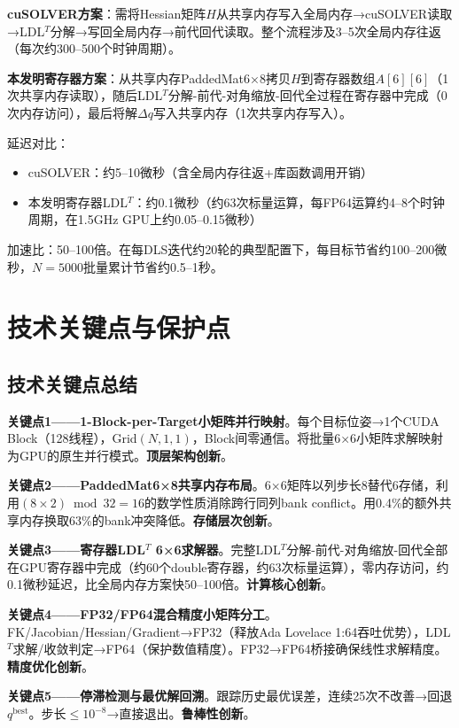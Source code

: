 \documentclass[a4paper,12pt]{ctexart}
\begin{document}
\textbf{cuSOLVER方案}：需将Hessian矩阵$H$从共享内存写入全局内存→cuSOLVER读取→LDL$^T$分解→写回全局内存→前代回代读取。整个流程涉及3--5次全局内存往返（每次约300--500个时钟周期）。

\textbf{本发明寄存器方案}：从共享内存PaddedMat6×8拷贝$H$到寄存器数组$A[6][6]$（1次共享内存读取），随后LDL$^T$分解-前代-对角缩放-回代全过程在寄存器中完成（0次内存访问），最后将解$\Delta q$写入共享内存（1次共享内存写入）。

延迟对比：
\begin{itemize}
    \item cuSOLVER：约5--10微秒（含全局内存往返+库函数调用开销）
    \item 本发明寄存器LDL$^T$：约0.1微秒（约63次标量运算，每FP64运算约4--8个时钟周期，在1.5GHz GPU上约0.05--0.15微秒）
\end{itemize}
加速比：50--100倍。在每DLS迭代约20轮的典型配置下，每目标节省约100--200微秒，$N=5000$批量累计节省约0.5--1秒。

\section{技术关键点与保护点}

\subsection{技术关键点总结}

\textbf{关键点1——1-Block-per-Target小矩阵并行映射}。每个目标位姿→1个CUDA Block（128线程），Grid$(N,1,1)$，Block间零通信。将批量6×6小矩阵求解映射为GPU的原生并行模式。\textbf{顶层架构创新}。

\textbf{关键点2——PaddedMat6×8共享内存布局}。6×6矩阵以列步长8替代6存储，利用$(8\times2)\bmod 32=16$的数学性质消除跨行同列bank conflict。用0.4\%的额外共享内存换取63\%的bank冲突降低。\textbf{存储层次创新}。

\textbf{关键点3——寄存器LDL$^T$ 6×6求解器}。完整LDL$^T$分解-前代-对角缩放-回代全部在GPU寄存器中完成（约60个double寄存器，约63次标量运算），零内存访问，约0.1微秒延迟，比全局内存方案快50--100倍。\textbf{计算核心创新}。

\textbf{关键点4——FP32/FP64混合精度小矩阵分工}。FK/Jacobian/Hessian/Gradient→FP32（释放Ada Lovelace 1:64吞吐优势），LDL$^T$求解/收敛判定→FP64（保护数值精度）。FP32→FP64桥接确保线性求解精度。\textbf{精度优化创新}。

\textbf{关键点5——停滞检测与最优解回溯}。跟踪历史最优误差，连续25次不改善→回退$q^{\text{best}}$。步长$\leq10^{-8}$→直接退出。\textbf{鲁棒性创新}。
\end{document}
